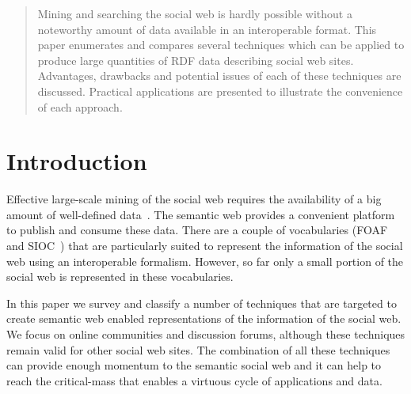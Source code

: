 \documentclass{../templates/www2008-submission}
\begin{document}


\maketitle

\begin{abstract}
Mining and searching the social web is hardly possible without
a noteworthy amount of data available in an interoperable
format. This paper enumerates and compares several techniques which can be
applied to produce large quantities of RDF data describing
social web sites. Advantages, drawbacks and potential issues of
each of these techniques are discussed. Practical applications
are presented to illustrate the convenience of each approach.
\end{abstract}



\section{Introduction}

Effective large-scale mining of the social web requires the
availability of a big amount of well-defined data~\cite{Mika2004}.
The semantic web provides a convenient platform to publish and
consume these data. There are a couple of vocabularies (FOAF~\cite{FOAF} and
SIOC~\cite{Bojars2007}) that are particularly suited to represent the
information of the social web using an interoperable formalism.
However, so far only a small portion of the social web is
represented in these vocabularies.

In this paper we survey and classify a number of techniques that
are targeted to create semantic web enabled representations of
the information of the social web. We focus on online communities
and discussion forums, although these techniques remain valid
for other social web sites. The combination of all these
techniques can provide enough momentum to the semantic social
web and it can help to reach the critical-mass that
enables a virtuous cycle of applications and data.
\end{document}
